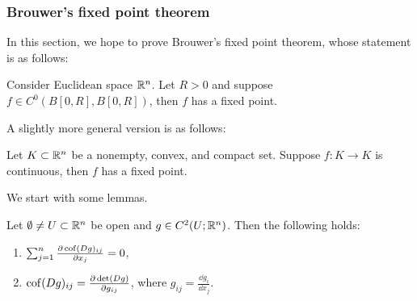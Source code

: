 \documentclass[a4paper]{article}
\begin{document}
\subsubsection{Brouwer's fixed point theorem}

In this section, we hope to prove Brouwer's fixed point theorem, whose
statement is as follows:

\begin{thm}
  Consider Euclidean space $\mathbb{R}^n$. Let $R > 0$ and suppose $f \in C^0
    (B[0, R], B[0, R])$, then $f$ has a fixed point.
\end{thm}

A slightly more general version is as follows:

\begin{thm}
  Let $K \subset \mathbb{R}^n$ be a nonempty, convex, and compact set. Suppose $f
    : K \to K$ is continuous, then $f$ has a fixed point.
\end{thm}

We start with some lemmas.

\begin{lemma}
  Let $\emptyset \neq U \subset \mathbb{R}^n$ be open and $g \in C^2 (U ; \mathbb{R}^n)$.
  Then the following holds:
  \begin{enumerate}
    \item $\sum_{j = 1}^n \frac{\partial \operatorname{cof} (Dg)_{ij}}{\partial x_j} = 0$,
    \item $\operatorname{cof} (Dg)_{ij} = \frac{\partial \det (Dg)}{\partial g_{ij}}$,
          where $g_{ij} = \frac{\dd g_i}{\dd x_j}$.
  \end{enumerate}
\end{lemma}
\end{document}
